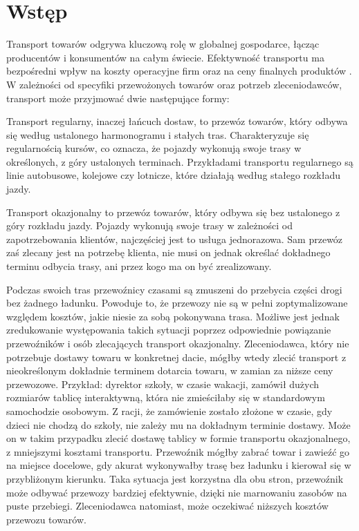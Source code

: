 \chapter{Wstęp}

Transport towarów odgrywa kluczową rolę w globalnej gospodarce, łącząc producentów i konsumentów na całym świecie. Efektywność transportu ma bezpośredni wpływ na koszty operacyjne firm oraz na ceny finalnych produktów \cite{MurphyWoodLogistyka}. W zależności od specyfiki przewożonych towarów oraz potrzeb zleceniodawców, transport może przyjmować dwie następujące formy:

\label{sec:przewoz_regularny}
Transport regularny, inaczej łańcuch dostaw, to przewóz towarów, który odbywa się według ustalonego harmonogramu i stałych tras. Charakteryzuje się regularnością kursów, co oznacza, że pojazdy wykonują swoje trasy w określonych, z góry ustalonych terminach. Przykładami transportu regularnego są linie autobusowe, kolejowe czy lotnicze, które działają według stałego rozkładu jazdy.

\label{sec:transport_okazjonalny}
Transport okazjonalny to przewóz towarów, który odbywa się bez ustalonego z góry rozkładu jazdy. Pojazdy wykonują swoje trasy w zależności od zapotrzebowania klientów, najczęściej jest to usługa jednorazowa. Sam przewóz zaś zlecany jest na potrzebę klienta, nie musi on jednak określać dokładnego terminu odbycia trasy, ani przez kogo ma on być zrealizowany.

Podczas swoich tras przewoźnicy czasami są zmuszeni do przebycia części drogi bez żadnego ładunku. Powoduje to, że przewozy nie są w pełni zoptymalizowane względem kosztów, jakie niesie za sobą pokonywana trasa. Możliwe jest jednak zredukowanie występowania takich sytuacji poprzez odpowiednie powiązanie przewoźników i osób zlecających transport okazjonalny. Zleceniodawca, który nie potrzebuje dostawy towaru w konkretnej dacie, mógłby wtedy zlecić transport z nieokreślonym dokładnie terminem dotarcia towaru, w zamian za niższe ceny przewozowe. Przykład: dyrektor szkoły, w czasie wakacji, zamówił dużych rozmiarów tablicę interaktywną, która nie zmieściłaby się w standardowym samochodzie osobowym. Z racji, że zamówienie zostało złożone w czasie, gdy dzieci nie chodzą do szkoły, nie zależy mu na dokładnym terminie dostawy. Może on w takim przypadku zlecić dostawę tablicy w formie transportu okazjonalnego, z mniejszymi kosztami transportu. Przewoźnik mógłby zabrać towar i zawieźć go na miejsce docelowe, gdy akurat wykonywałby trasę bez ładunku i kierował się w przybliżonym kierunku. Taka sytuacja jest korzystna dla obu stron, przewoźnik może odbywać przewozy bardziej efektywnie, dzięki nie marnowaniu zasobów na puste przebiegi. Zleceniodawca natomiast, może oczekiwać niższych kosztów przewozu towarów.


